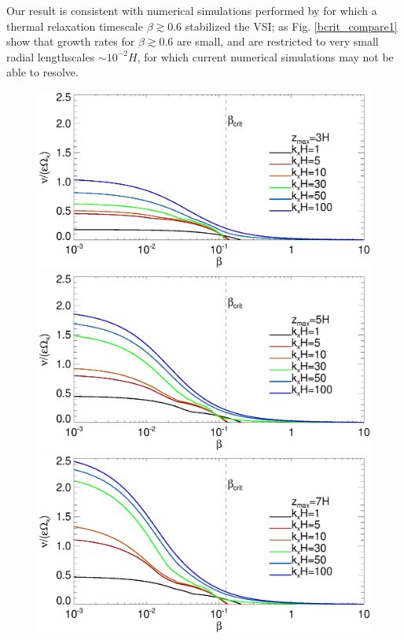 Our result is consistent with numerical simulations performed by
\cite{nelson13} for which a thermal relaxation timescale $\beta\gtrsim
0.6$ stabilized the VSI; as Fig. \ref{bcrit_compare1} show that growth
rates for $\beta\gtrsim 0.6$ are small, and are restricted to very
small radial lengthscales $\sim 10^{-2}H$, for which current numerical
simulations may not be able to resolve.

\begin{figure}
  \includegraphics[width=\linewidth,clip=true,trim=0cm 1.75cm 0cm 0.9cm]{figures/gcorr_compare_iso_maxrate_z3}
  \includegraphics[width=\linewidth,clip=true,trim=0cm 1.75cm 0cm 0.9cm]{figures/gcorr_compare_iso_maxrate_z5}
  \includegraphics[width=\linewidth,clip=true,trim=0cm 0.0cm 0cm 0.9cm]{figures/gcorr_compare_iso_maxrate_z7} 

\end{figure}
